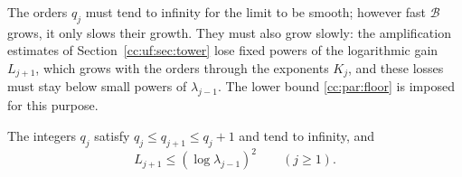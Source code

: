The orders $q_j$ must tend to infinity for the limit to be smooth;
however fast $\mathcal B$ grows, it only slows their growth. They must
also grow slowly: the amplification estimates of
Section~\ref{cc:uf:sec:tower} lose fixed powers of the logarithmic gain
$L_{j+1}$, which grows with the orders through the exponents $K_j$, and
these losses must stay below small powers of $\lambda_{j-1}$. The lower
bound \eqref{cc:par:floor} is imposed for this purpose.

\begin{lemma}\label{cc:uf:tower:lem:slow-orders}
The integers $q_j$ satisfy $q_j\le q_{j+1}\le q_j+1$ and tend to
infinity, and
\begin{equation}\label{cc:uf:tower:eq:uniform}
 L_{j+1}\le(\log\lambda_{j-1})^2\qquad(j\ge1).
\end{equation}
\end{lemma}

